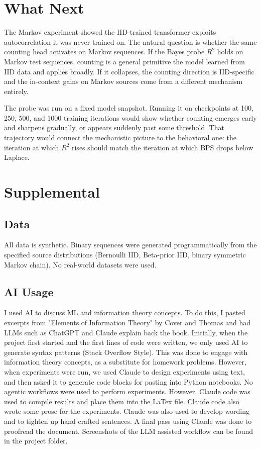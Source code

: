 \documentclass[onecolumn,english,12pt]{IEEEtran}
\begin{document}
\section{What Next}
\label{sec:future}

The Markov experiment showed the IID-trained transformer exploits autocorrelation it was never trained on.
The natural question is whether the same counting head activates on Markov sequences.
If the Bayes probe $R^2$ holds on Markov test sequences, counting is a general primitive the model learned from IID data and applies broadly.
If it collapses, the counting direction is IID-specific and the in-context gains on Markov sources come from a different mechanism entirely.

The probe was run on a fixed model snapshot.
Running it on checkpoints at 100, 250, 500, and 1000 training iterations would show whether counting emerges early and sharpens gradually, or appears suddenly past some threshold.
That trajectory would connect the mechanistic picture to the behavioral one: the iteration at which $R^2$ rises should match the iteration at which BPS drops below Laplace.

\section{Supplemental}
\label{sec:supplemental}

\subsection{Data}

All data is synthetic.
Binary sequences were generated programmatically from the specified source distributions (Bernoulli IID, Beta-prior IID, binary symmetric Markov chain).
No real-world datasets were used.


\subsection{AI Usage}
I used AI to discuss ML and information theory concepts. To do this, I pasted excerpts from "Elements of Information Theory" by Cover and Thomas and had LLMs such as ChatGPT and Claude explain back the book. Initially, when the project first started and the first lines of code were written, we only used AI to generate syntax patterns (Stack Overflow Style). This was done to engage with information theory concepts, as a substitute for homework problems. However, when experiments were run, we used Claude to design experiments using text, and then asked it to generate code blocks for pasting into Python notebooks. No agentic workflows were used to perform experiments. However, Claude code was used to compile results and place them into the LaTex file. Claude code also wrote some prose for the experiments. Claude was also used to develop wording and to tighten up hand crafted sentences. A final pass using Claude was done to proofread the document. Screenshots of the LLM assisted workflow can be found in the project folder.



\nocite{HostMadsen24}
\end{document}
